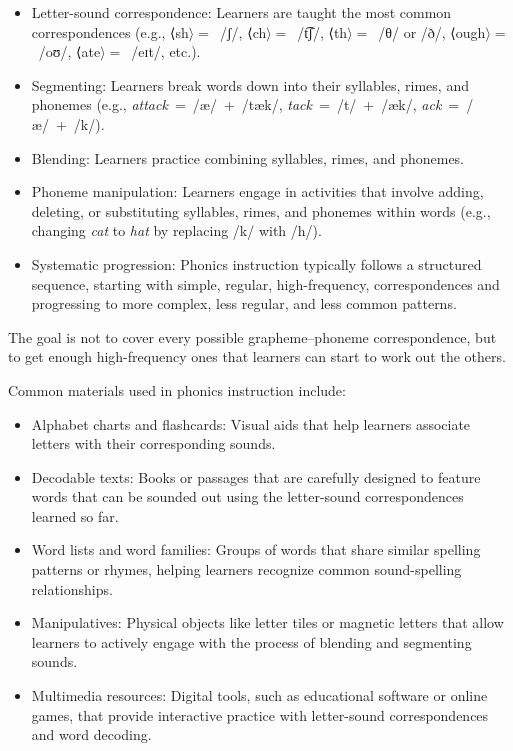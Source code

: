 \begin{itemize}[noitemsep]
    \item Letter-sound correspondence: Learners are taught the most common correspondences (e.g., ⟨sh$\rangle=$~/ʃ/, ⟨ch$\rangle=$~/t͡ʃ/, ⟨th$\rangle=$~/θ/ or /ð/, ⟨ough$\rangle=$~/oʊ/, ⟨ate$\rangle=$~/eɪt/, etc.).
    \item Segmenting: Learners break words down into their syllables, rimes, and phonemes (e.g., \textit{attack}~=~/æ/~+~/tæk/, \textit{tack}~=~/t/~+~/æk/, \textit{ack}~=~/æ/~+~/k/).
    \item Blending: Learners practice combining syllables, rimes, and phonemes.
    \item Phoneme manipulation: Learners engage in activities that involve adding, deleting, or substituting syllables, rimes, and phonemes within words (e.g., changing \textit{cat} to \textit{hat} by replacing /k/ with /h/).
    \item Systematic progression: Phonics instruction typically follows a structured sequence, starting with simple, regular, high-frequency, correspondences and progressing to more complex, less regular, and less common patterns.
\end{itemize}

The goal is not to cover every possible grapheme--phoneme correspondence, but to get enough high-frequency ones that learners can start to work out the others.

Common materials used in phonics instruction include:

\begin{itemize}[noitemsep]
    \item Alphabet charts and flashcards: Visual aids that help learners associate letters with their corresponding sounds.
    \item Decodable texts: Books or passages that are carefully designed to feature words that can be sounded out using the letter-sound correspondences learned so far.
    \item Word lists and word families: Groups of words that share similar spelling patterns or rhymes, helping learners recognize common sound-spelling relationships.
    \item Manipulatives: Physical objects like letter tiles or magnetic letters that allow learners to actively engage with the process of blending and segmenting sounds.
    \item Multimedia resources: Digital tools, such as educational software or online games, that provide interactive practice with letter-sound correspondences and word decoding.
\end{itemize}

